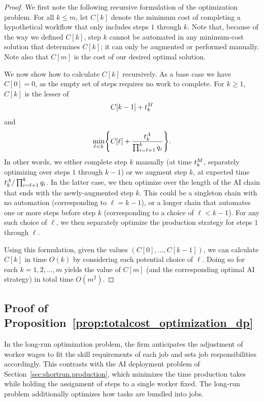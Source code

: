 \begin{proof}
We first note the following recursive formulation of the optimization problem.
For all $k \leq m$, let $C[k]$ denote the minimum cost of completing a hypothetical workflow that only includes steps $1$ through $k$.
Note that, because of the way we defined $C[k]$, step $k$ cannot be automated in any minimum-cost solution that determines $C[k]$; it can only be augmented or performed manually.
Note also that $C[m]$ is the cost of our desired optimal solution.

We now show how to calculate $C[k]$ recursively.
As a base case we have $C[0] = 0$, as the empty set of steps requires no work to complete.
For $k \geq 1$, $C[k]$ is the lesser of
\[ C[k-1] + t^{M}_{k} \]
and
\[ \min_{\ell < k} \Biggl\{ C[\ell] + \frac{t^{A}_{k}}{\prod_{i=\ell+1}^k q_i} \Biggr\}.
\]
In other words, we either complete step $k$ manually (at time $t^{M}_{k}$, separately optimizing over steps $1$ through $k-1$) or we augment step $k$, at expected time $t^{A}_{k}/\prod_{i=\ell+1}^k q_i$.
In the latter case, we then optimize over the length of the AI chain that ends with the newly-augmented step $k$.
This could be a singleton chain with no automation (corresponding to $\ell = k-1$), or a longer chain that automates one or more steps before step $k$ (corresponding to a choice of $\ell < k-1$).
For any such choice of $\ell$, we then separately optimize the production strategy for steps $1$ through $\ell$.

Using this formulation, given the values $(C[0], \dotsc, C[k-1])$, we can calculate $C[k]$ in time $O(k)$ by considering each potential choice of $\ell$.
Doing so for each $k = 1, 2, \dotsc, m$ yields the value of $C[m]$ (and the corresponding optimal AI strategy) in total time $O(m^2)$.
\end{proof}

\subsection{Proof of Proposition~\ref{prop:totalcost_optimization_dp}}
\label{app:jobdesign.longrun}

In the long-run optimization problem, the firm anticipates the adjustment of worker wages to fit the skill requirements of each job and sets job responsibilities accordingly.
This contrasts with the AI deployment problem of Section~\ref{sec:shortrun.production}, which minimizes the time production takes while holding the assignment of steps to a single worker fixed. 
The long-run problem additionally optimizes how tasks are bundled into jobs.


